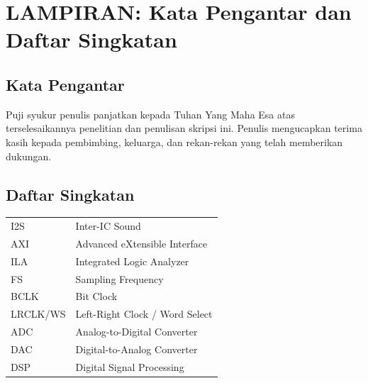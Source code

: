 \chapter*{LAMPIRAN: Kata Pengantar dan Daftar Singkatan}

\section*{Kata Pengantar}
Puji syukur penulis panjatkan kepada Tuhan Yang Maha Esa atas terselesaikannya penelitian dan penulisan skripsi ini. Penulis mengucapkan terima kasih kepada pembimbing, keluarga, dan rekan-rekan yang telah memberikan dukungan.

\section*{Daftar Singkatan}
\begin{tabular}{ll}
I2S & Inter-IC Sound \\
AXI & Advanced eXtensible Interface \\
ILA & Integrated Logic Analyzer \\
FS & Sampling Frequency \\
BCLK & Bit Clock \\
LRCLK/WS & Left-Right Clock / Word Select \\
ADC & Analog-to-Digital Converter \\
DAC & Digital-to-Analog Converter \\
DSP & Digital Signal Processing \\
\end{tabular}

